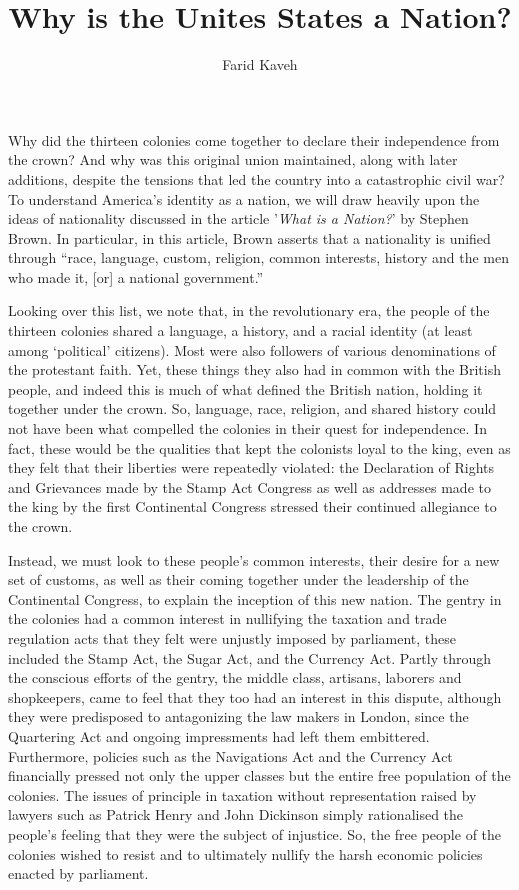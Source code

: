 \documentclass[a4paper]{article}
\begin{document}
\title{Why is the Unites States a Nation?}
\subtitle{}
\author{Farid Kaveh}

\maketitle

Why did the thirteen colonies come together to declare their independence from the crown? And why was this original union maintained, along with later additions, despite the tensions that led the country into a catastrophic civil war? To understand America’s identity as a nation, we will draw heavily upon the ideas of nationality discussed in the article '\textit{What is a Nation?}' by Stephen Brown. In particular, in this article, Brown asserts that a nationality is unified through “race, language, custom, religion, common interests, history and the men who made it, [or] a national government.” \autocite[]{10.2307/30083977}

Looking over this list, we note that, in the revolutionary era, the people of the thirteen colonies shared a language, a history, and a racial identity (at least among ‘political’ citizens). Most were also followers of various denominations of the protestant faith. Yet, these things they also had in common with the British people, and indeed this is much of what defined the British nation, holding it together under the crown. So, language, race, religion, and shared history could not have been what compelled the colonies in their quest for independence. In fact, these would be the qualities that kept the colonists loyal to the king, even as they felt that their liberties were repeatedly violated: the Declaration of Rights and Grievances made by the Stamp Act Congress as well as addresses made to the king by the first Continental Congress stressed their continued allegiance to the crown. \autocite[pp. 172-173, 158-159]{AmericanRep1}

Instead, we must look to these people’s common interests, their desire for a new set of customs, as well as their coming together under the leadership of the Continental Congress, to explain the inception of this new nation. The gentry in the colonies had a common interest in nullifying the taxation and trade regulation acts that they felt were unjustly imposed by parliament, these included the Stamp Act, the Sugar Act, and the Currency Act.\autocite[pp. 158-160]{AmericanRep1} Partly through the conscious efforts of the gentry, the middle class, artisans, laborers and shopkeepers, came to feel  that they too had an interest in this dispute, although they were predisposed to antagonizing the law makers in London, since the Quartering Act and ongoing impressments had left them embittered. Furthermore, policies such as the Navigations Act and the Currency Act financially pressed not only the upper classes but the entire free population of the colonies. The issues of principle in taxation without representation raised by lawyers such as Patrick Henry and John Dickinson simply rationalised the people’s feeling that they were the subject of injustice. So, the free people of the colonies wished to resist and to ultimately nullify the harsh economic policies enacted by parliament.
\end{document}
